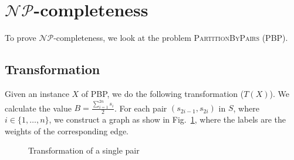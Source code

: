 \section{$\mathcal{NP}$-completeness}

To prove $\mathcal{NP}$-completeness, we look at the problem \textsc{PartitionByPairs} (PBP). 

\subsection{Transformation}
Given an instance $X$ of PBP, we do the following transformation ($T(X)$). We calculate the value $B = \frac{\sum_{i=1}^{2n} s_i}{2}$. For each pair $(s_{2i-1}, s_{2i})$ in $S$,  where $i \in \lbrace 1,\dots, n \rbrace $, we construct a graph as show in Fig.~\ref{fig:transform1}, where the labels are the weights of the corresponding edge. 

\begin{figure}[!htb]
\centering
{}
\caption{Transformation of a single pair}
\label{fig:transform1}
\end{figure}

